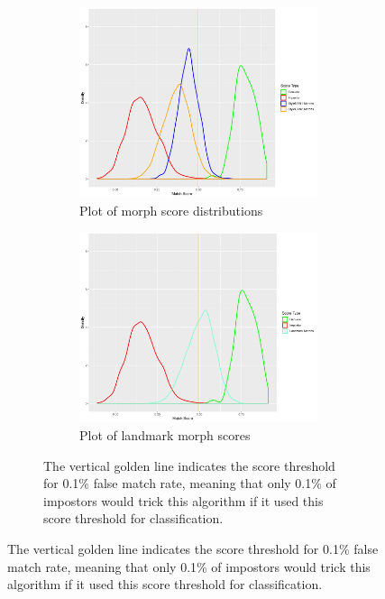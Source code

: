 \documentclass[12pt]{article}
\begin{document}
\begin{figure}[t]
\begin{figure}[t]
    \centering
    \begin{subfigure}{0.45\textwidth}
        \centering
        \includegraphics[width=\textwidth]{dlib_fr_gan_hist.pdf}
        \caption{Plot of morph score distributions}
        \label{gan_plot}
    \end{subfigure}
    \begin{subfigure}{0.45\textwidth}
        \centering
        \includegraphics[width=\textwidth]{dlib_fr_landmark_hist.pdf}
        \caption{Plot of landmark morph scores}
        \label{landmark_plot}
    \end{subfigure}
    \caption{The vertical golden line indicates the score threshold for 0.1\% false match rate, meaning that only 0.1\% of impostors would trick this algorithm if it used this score threshold for classification.}
\end{figure}

\end{figure}
\end{document}
